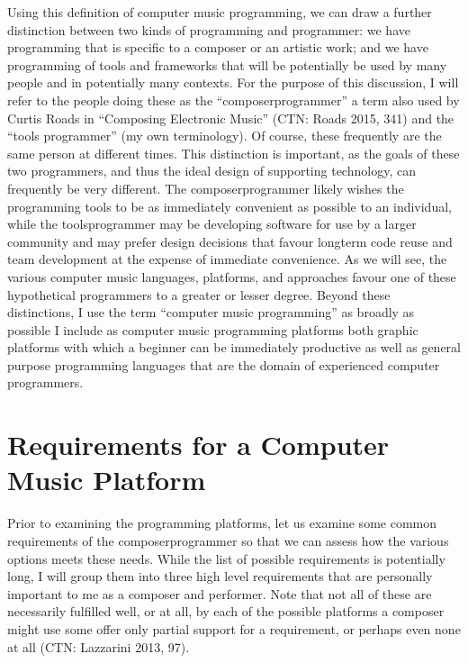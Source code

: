 \documentclass[letterpaper,10pt,english]{sphinxmanual}
\begin{document}
\sphinxAtStartPar
Using this definition of computer music programming, we can draw a further distinction
between two kinds of programming and programmer:
we have programming that is specific to a composer or an artistic work;
and we have programming of tools and frameworks that will be potentially be used by many
people and in potentially many contexts.
For the purpose of this discussion, I will refer to the people doing these as the “composer\sphinxhyphen{}programmer”
\sphinxhyphen{} a term also used by Curtis Roads in “Composing Electronic Music” (CTN: Roads 2015, 341) \sphinxhyphen{}
and the “tools programmer” (my own terminology).
Of course, these frequently are the same person at different times.
This distinction is important, as the goals of these two programmers, and thus the
ideal design of supporting technology, can frequently be very different.
The composer\sphinxhyphen{}programmer likely wishes the programming tools to be as immediately convenient as possible to
an individual, while the tools\sphinxhyphen{}programmer may be
developing software for use by a larger community and may prefer design decisions
that favour long\sphinxhyphen{}term code reuse and team development at the expense of immediate convenience.
As we will see, the various computer music languages, platforms, and approaches
favour one of these hypothetical programmers to a greater or lesser degree.
Beyond these distinctions, I use the term “computer music programming” as broadly
as possible \sphinxhyphen{} I include as computer music programming platforms both graphic platforms with
which a beginner can be immediately productive as well as general purpose programming
languages that are the domain of experienced computer programmers.


\section{Requirements for a Computer Music Platform}
\label{\detokenize{background:requirements-for-a-computer-music-platform}}
\sphinxAtStartPar
Prior to examining the programming platforms, let us examine some
common requirements of the composer\sphinxhyphen{}programmer so that we can assess how the various
options meets these needs.
While the list of possible requirements is potentially long, I will group
them into three high level requirements that are personally important to me as
a composer and performer. Note that not all of these are necessarily fulfilled well, or at all,
by each of the possible platforms a composer might use \sphinxhyphen{} some offer
only partial support for a requirement, or perhaps even none at all (CTN: Lazzarini 2013, 97).
\end{document}
